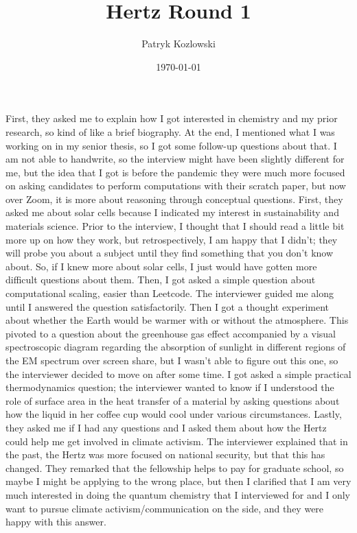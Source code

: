 \documentclass[12pt]{article}
\author{Patryk Kozlowski}
\title{Hertz Round 1}
\date{\today}
\begin{document}
\maketitle
First, they asked me to explain how I got interested in chemistry and my prior research, so kind of like a brief biography. At the end, I mentioned what I was working on in my senior thesis, so I got some follow-up questions about that. I am not able to handwrite, so the interview might have been slightly different for me, but the idea that I got is before the pandemic they were much more focused on asking candidates to perform computations with their scratch paper, but now over Zoom, it is more about reasoning through conceptual questions. First, they asked me about solar cells because I indicated my interest in sustainability and materials science. Prior to the interview, I thought that I should read a little bit more up on how they work, but retrospectively, I am happy that I didn't; they will probe you about a subject until they find something that you don't know about. So, if I knew more about solar cells, I just would have gotten more difficult questions about them. Then, I got asked a simple question about computational scaling, easier than Leetcode. The interviewer guided me along until I answered the question satisfactorily. Then I got a thought experiment about whether the Earth would be warmer with or without the atmosphere. This pivoted to a question about the greenhouse gas effect accompanied by a visual spectroscopic diagram regarding the absorption of sunlight in different regions of the EM spectrum over screen share, but I wasn't able to figure out this one, so the interviewer decided to move on after some time. I got asked a simple practical thermodynamics question; the interviewer wanted to know if I understood the role of surface area in the heat transfer of a material by asking questions about how the liquid in her coffee cup would cool under various circumstances. Lastly, they asked me if I had any questions and I asked them about how the Hertz could help me get involved in climate activism. The interviewer explained that in the past, the Hertz was more focused on national security, but that this has changed. They remarked that the fellowship helps to pay for graduate school, so maybe I might be applying to the wrong place, but then I clarified that I am very much interested in doing the quantum chemistry that I interviewed for and I only want to pursue climate activism/communication on the side, and they were happy with this answer.
\end{document}
